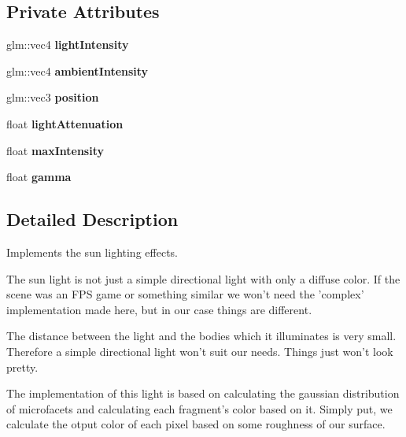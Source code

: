 \subsection*{Private Attributes}
\begin{DoxyCompactItemize}
\item 
\hypertarget{class_sun_light_a1fe5f1436fda2baea246524224a907b3}{glm\-::vec4 {\bfseries light\-Intensity}}\label{class_sun_light_a1fe5f1436fda2baea246524224a907b3}

\item 
\hypertarget{class_sun_light_ad3284638146c2cea20545a217b87dfc1}{glm\-::vec4 {\bfseries ambient\-Intensity}}\label{class_sun_light_ad3284638146c2cea20545a217b87dfc1}

\item 
\hypertarget{class_sun_light_a69194d86c6aaf89e2a98f6e0672c7660}{glm\-::vec3 {\bfseries position}}\label{class_sun_light_a69194d86c6aaf89e2a98f6e0672c7660}

\item 
\hypertarget{class_sun_light_ae19dacac63ebedb1ffe586b145d9c06e}{float {\bfseries light\-Attenuation}}\label{class_sun_light_ae19dacac63ebedb1ffe586b145d9c06e}

\item 
\hypertarget{class_sun_light_afa0bf55ee57d63ee4d3e28b9dea542da}{float {\bfseries max\-Intensity}}\label{class_sun_light_afa0bf55ee57d63ee4d3e28b9dea542da}

\item 
\hypertarget{class_sun_light_a9ab694ee6c4b224c75c5780c921e1696}{float {\bfseries gamma}}\label{class_sun_light_a9ab694ee6c4b224c75c5780c921e1696}

\end{DoxyCompactItemize}


\subsection{Detailed Description}
Implements the sun lighting effects. 

The sun light is not just a simple directional light with only a diffuse color. If the scene was an F\-P\-S game or something similar we won't need the 'complex' implementation made here, but in our case things are different.

The distance between the light and the bodies which it illuminates is very small. Therefore a simple directional light won't suit our needs. Things just won't look pretty.

The implementation of this light is based on calculating the gaussian distribution of microfacets and calculating each fragment's color based on it. Simply put, we calculate the otput color of each pixel based on some roughness of our surface.

